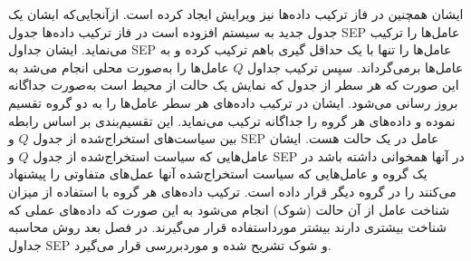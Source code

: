 ایشان همچنین در فاز ترکیب داده‌ها نیز ویرایش ایجاد کرده است. ازآنجایی‌که ایشان یک جدول جدید به سیستم افزوده است در فاز ترکیب داده‌ها جدول SEP عامل‌ها را ترکیب می‌نماید. ایشان جداول SEP عامل‌ها را تنها با یک حداقل گیری باهم ترکیب کرده و به عامل‌ها برمی‌گرداند. سپس ترکیب جداول $Q$ عامل‌ها را به‌صورت محلی انجام می‌شد به این صورت که هر سطر از جدول که نمایش یک حالت از محیط است به‌صورت جداگانه بروز رسانی می‌شود. ایشان در ترکیب داده‌های هر سطر عامل‌ها را به دو گروه تقسیم نموده و داده‌های هر گروه را جداگانه ترکیب می‌نماید. این تقسیم‌بندی بر اساس رابطه بین سیاست‌های استخراج‌شده از جدول $Q$ و SEP عامل در یک حالت هست. ایشان عامل‌هایی که سیاست استخراج‌شده از جدول $Q$ و SEP در آنها همخوانی داشته باشد در یک گروه و عامل‌هایی که سیاست استخراج‌شده آنها عمل‌های متفاوتی را پیشنهاد می‌کنند را در گروه دیگر قرار داده است. ترکیب داده‌های هر گروه با استفاده از میزان شناخت عامل از آن حالت (شوک) انجام می‌شود به این صورت که داده‌های عملی که شناخت بیشتری دارند بیشتر مورداستفاده قرار می‌گیرند. در فصل بعد روش محاسبه جداول SEP و شوک تشریح شده و موردبررسی قرار می‌گیرد.
